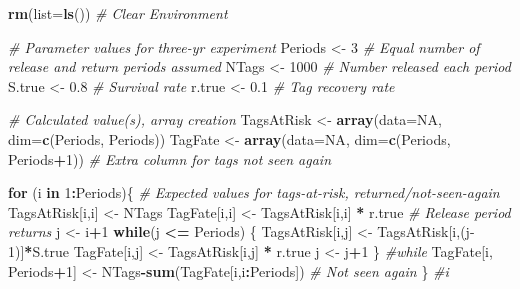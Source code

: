 \documentclass[
]{krantz}
\makeatletter
\newenvironment{Shaded}{\begin{snugshade}}{\end{snugshade}}
\newcommand{\AttributeTok}[1]{\textcolor[rgb]{0.27,0.27,0.27}{#1}}
\newcommand{\CommentTok}[1]{\textcolor[rgb]{0.37,0.37,0.37}{\textit{#1}}}
\newcommand{\ConstantTok}[1]{\textcolor[rgb]{0.37,0.37,0.37}{#1}}
\newcommand{\ControlFlowTok}[1]{\textcolor[rgb]{0.27,0.27,0.27}{\textbf{#1}}}
\newcommand{\DecValTok}[1]{\textcolor[rgb]{0.06,0.06,0.06}{#1}}
\newcommand{\FloatTok}[1]{\textcolor[rgb]{0.06,0.06,0.06}{#1}}
\newcommand{\FunctionTok}[1]{\textcolor[rgb]{0.27,0.27,0.27}{\textbf{#1}}}
\newcommand{\NormalTok}[1]{#1}
\newcommand{\OtherTok}[1]{\textcolor[rgb]{0.37,0.37,0.37}{#1}}
\newcommand{\SpecialCharTok}[1]{\textcolor[rgb]{0.43,0.43,0.43}{\textbf{#1}}}
\newenvironment{kframe}{%
\medskip{}
\setlength{\fboxsep}{.8em}
 \def\at@end@of@kframe{}%
 \ifinner\ifhmode%
  \def\at@end@of@kframe{\end{minipage}}%
  \begin{minipage}{\columnwidth}%
 \fi\fi%
 \def\FrameCommand##1{\hskip\@totalleftmargin \hskip-\fboxsep
 \colorbox{shadecolor}{##1}\hskip-\fboxsep
     \hskip-\linewidth \hskip-\@totalleftmargin \hskip\columnwidth}%
 \MakeFramed {\advance\hsize-\width
   \@totalleftmargin\z@ \linewidth\hsize
   \@setminipage}}%
 {\par\unskip\endMakeFramed%
 \at@end@of@kframe}
\renewenvironment{Shaded}{\begin{kframe}}{\end{kframe}}
\makeatother
\begin{document}
\begin{Shaded}
\begin{Highlighting}[]
\FunctionTok{rm}\NormalTok{(}\AttributeTok{list=}\FunctionTok{ls}\NormalTok{()) }\CommentTok{\# Clear Environment}

\CommentTok{\# Parameter values for three{-}yr experiment}
\NormalTok{Periods }\OtherTok{\textless{}{-}} \DecValTok{3}  \CommentTok{\# Equal number of release and return periods assumed}
\NormalTok{NTags }\OtherTok{\textless{}{-}} \DecValTok{1000} \CommentTok{\# Number released each period}
\NormalTok{S.true }\OtherTok{\textless{}{-}} \FloatTok{0.8} \CommentTok{\# Survival rate}
\NormalTok{r.true }\OtherTok{\textless{}{-}} \FloatTok{0.1} \CommentTok{\# Tag recovery rate}

\CommentTok{\# Calculated value(s), array creation}
\NormalTok{TagsAtRisk }\OtherTok{\textless{}{-}} \FunctionTok{array}\NormalTok{(}\AttributeTok{data=}\ConstantTok{NA}\NormalTok{, }\AttributeTok{dim=}\FunctionTok{c}\NormalTok{(Periods, Periods))}
\NormalTok{TagFate }\OtherTok{\textless{}{-}} \FunctionTok{array}\NormalTok{(}\AttributeTok{data=}\ConstantTok{NA}\NormalTok{, }\AttributeTok{dim=}\FunctionTok{c}\NormalTok{(Periods, Periods}\SpecialCharTok{+}\DecValTok{1}\NormalTok{))   }
\CommentTok{\# Extra column for tags not seen again}

\ControlFlowTok{for}\NormalTok{ (i }\ControlFlowTok{in} \DecValTok{1}\SpecialCharTok{:}\NormalTok{Periods)\{ }
\CommentTok{\# Expected values for tags{-}at{-}risk, returned/not{-}seen{-}again}
\NormalTok{    TagsAtRisk[i,i] }\OtherTok{\textless{}{-}}\NormalTok{ NTags}
\NormalTok{    TagFate[i,i] }\OtherTok{\textless{}{-}}\NormalTok{  TagsAtRisk[i,i] }\SpecialCharTok{*}\NormalTok{ r.true }\CommentTok{\# Release period returns}
\NormalTok{  j }\OtherTok{\textless{}{-}}\NormalTok{ i}\SpecialCharTok{+}\DecValTok{1}
  \ControlFlowTok{while}\NormalTok{(j }\SpecialCharTok{\textless{}=}\NormalTok{ Periods) \{}
\NormalTok{      TagsAtRisk[i,j] }\OtherTok{\textless{}{-}}\NormalTok{ TagsAtRisk[i,(j}\DecValTok{{-}1}\NormalTok{)]}\SpecialCharTok{*}\NormalTok{S.true}
\NormalTok{      TagFate[i,j] }\OtherTok{\textless{}{-}}\NormalTok{ TagsAtRisk[i,j] }\SpecialCharTok{*}\NormalTok{ r.true}
\NormalTok{      j }\OtherTok{\textless{}{-}}\NormalTok{ j}\SpecialCharTok{+}\DecValTok{1}
\NormalTok{     \} }\CommentTok{\#while}
\NormalTok{   TagFate[i, Periods}\SpecialCharTok{+}\DecValTok{1}\NormalTok{] }\OtherTok{\textless{}{-}}\NormalTok{ NTags}\SpecialCharTok{{-}}\FunctionTok{sum}\NormalTok{(TagFate[i,i}\SpecialCharTok{:}\NormalTok{Periods]) }
     \CommentTok{\# Not seen again}
\NormalTok{  \} }\CommentTok{\#i}


\end{Highlighting}
\end{Shaded}
\end{document}
